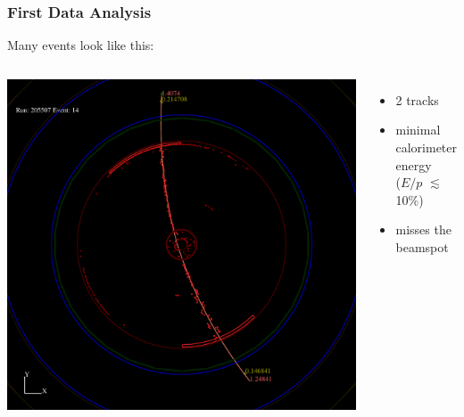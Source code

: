\documentclass[12pt,compress]{beamer}
\begin{document}
\begin{frame}
\frametitle{First Data Analysis}
Many events look like this:

\vfill
\begin{columns}[c]
\includegraphics[width=\linewidth]{cosmicray}

\begin{itemize}\setlength{\itemsep}{0.5 cm}
\item 2 tracks
\item minimal calorimeter energy \\ ($E/p$ $\lesssim$ 10\%)
\item misses the beamspot
\end{itemize}

\end{columns}
\end{frame}
\end{document}
